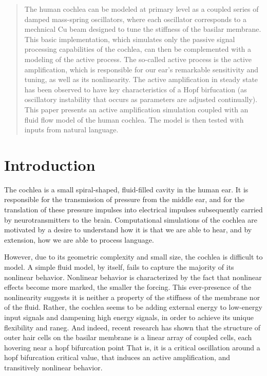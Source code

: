 \documentclass[12pt]{article}
\begin{document}
\maketitle

\begin{abstract}
The human cochlea can be modeled at primary level as a coupled series of damped mass-spring oscillators, where each oscillator corresponds to a mechnical Cu beam designed to tune the stiffness of the basilar membrane. This basic implementation, which simulates only the passive signal processing capabilities of the cochlea, can then be complemented with a modeling of the active process. The so-called active process is the active amplification, which is responsible for our ear's remarkable sensitivity and tuning, as well as its nonlinearity. The active amplification in steady state has been observed to have key characteristics of a Hopf birfucation (as oscillatory instability that occurs as parameters are adjusted continually). This paper presents an active amplification simulation coupled with an fluid flow model of the human cochlea. The model is then tested with inputs from natural language. 
\end{abstract}
 

\section{Introduction}
The cochlea is a small spiral-shaped, fluid-filled cavity in the human ear. It is responsible for the transmission of pressure from the middle ear, and for the translation of these pressure impulses into electrical impulses subsequently carried by neurotransmitters to the brain. Computational simulations of the cochlea are motivated by a desire to understand how it is that we are able to hear, and by extension, how we are able to process language.
   
However, due to its geometric complexity and small size, the cochlea is difficult to model. A simple fluid model, by itself, fails to capture the majority of its nonlinear behavior. Nonlinear behavior is characterized by the fact that nonlinear effects become more marked, the smaller the forcing. This ever-presence of the nonlinearity suggests it is neither a property of the stiffness of the membrane nor of the fluid. Rather, the cochlea seems to be adding external energy to low-energy input signals and dampening high energy signals, in order to achieve its unique flexibility and raneg. And indeed, recent research has shown that the structure of outer hair cells on the basilar membrane is a linear array of coupled cells, each hovering near a hopf bifurcation point That is, it is a critical oscillation around a hopf bifurcation critical value, that induces an active amplification, and transitively nonlinear behavior.
\end{document}
